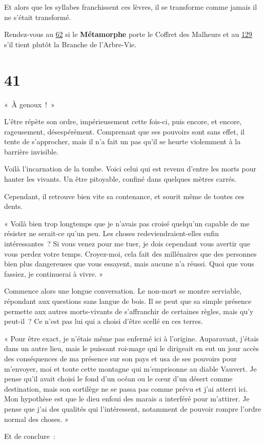 \documentclass{report}
\newcommand{\gsection}[1]{
    \section{#1}
    \label{section-#1}
}
\newcommand{\glink}[1]{\hyperref[section-#1]{#1}}
\newcommand{\hero}[1]{\textbf{#1}}
\begin{document}
Et alors que les syllabes franchissent ces lèvres, il se transforme comme jamais il ne s'était transformé.

Rendez-vous au \glink{62} si le \hero{Métamorphe} porte le Coffret des Malheurs et au \glink{129} s'il tient plutôt la Branche de l'Arbre-Vie.

\gsection{41}

« À genoux ! »

L'être répète son ordre, impérieusement cette fois-ci, puis encore, et encore, rageusement, désespérément. Comprenant que ses pouvoirs sont sans effet, il tente de s'approcher, mais il n'a fait un pas qu'il se heurte violemment à la barrière invisible.

Voilà l'incarnation de la tombe. Voici celui qui est revenu d'entre les morts pour hanter les vivants. Un être pitoyable, confiné dans quelques mètres carrés.

Cependant, il retrouve bien vite sa contenance, et sourit même de toutes ces dents.

« Voilà bien trop longtemps que je n'avais pas croisé quelqu'un capable de me résister ne serait-ce qu'un peu. Les choses redeviendraient-elles enfin intéressantes ? Si vous venez pour me tuer, je dois cependant vous avertir que vous perdez votre temps. Croyez-moi, cela fait des millénaires que des personnes bien plus dangereuses que vous essayent, mais aucune n'a réussi. Quoi que vous fassiez, je continuerai à vivre. »

Commence alors une longue conversation. Le non-mort se montre serviable, répondant aux questions sans langue de bois. Il se peut que sa simple présence permette aux autres morts-vivants de s'affranchir de certaines règles, mais qu'y peut-il ? Ce n'est pas lui qui a choisi d'être scellé en ces terres.

« Pour être exact, je n'étais même pas enfermé ici à l'origine. Auparavant, j'étais dans un autre lieu, mais le puissant roi-mage qui le dirigeait en eut un jour accès des conséquences de ma présence sur son pays et usa de ses pouvoirs pour m'envoyer, moi et toute cette montagne qui m'emprisonne au diable Vauvert. Je pense qu'il avait choisi le fond d'un océan ou le cœur d'un désert comme destination, mais son sortilège ne se passa pas comme prévu et j'ai atterri ici. Mon hypothèse est que le dieu enfoui des marais a interféré pour m'attirer. Je pense que j'ai des qualités qui l'intéressent, notamment de pouvoir rompre l'ordre normal des choses. »

Et de conclure :
\end{document}

